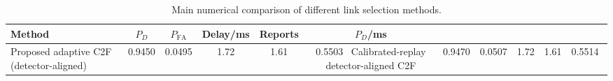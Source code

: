 \begin{table}[t]
    \centering
    \caption{Main numerical comparison of different link selection methods.}
    \label{tab:main_summary}
    \begin{tabular}{l c c c c c}
        \hline
        Method & $P_D$ & $P_{\mathrm{FA}}$ & Delay/ms & Reports & $P_D$/ms \\
        \hline
        Proposed adaptive C2F (detector-aligned) & 0.9450 & 0.0495 & 1.72 & 1.61 & 0.5503 \
        Calibrated-replay detector-aligned C2F & 0.9470 & 0.0507 & 1.72 & 1.61 & 0.5514 \
        \hline
    \end{tabular}
\end{table}
